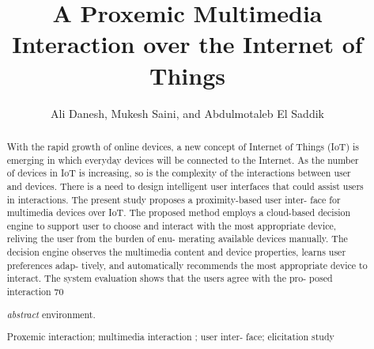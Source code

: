 \documentclass[runningheads,a4paper]{llncs}
\newcommand{\keywords}[1]{\par\addvspace\baselineskip
\noindent\keywordname\enspace\ignorespaces#1}
\begin{document}
\mainmatter  %

\title{A Proxemic Multimedia Interaction over the Internet of Things}


%
%
\author{Ali Danesh, Mukesh Saini, and Abdulmotaleb El Saddik }






%
%

\maketitle


\begin{abstract}
With the rapid growth of online devices, a new concept of Internet of Things (IoT) is emerging in which everyday devices will be connected to the Internet. As the number of devices in IoT is increasing, so is the complexity of the interactions between user and devices. There is a need to design intelligent user interfaces that could assist users in interactions. The present study proposes a proximity-based user inter- face for multimedia devices over IoT. The proposed method employs a cloud-based decision engine to support user to choose and interact with the most appropriate device, reliving the user from the burden of enu- merating available devices manually. The decision engine observes the multimedia content and device properties, learns user preferences adap- tively, and automatically recommends the most appropriate device to interact. The system evaluation shows that the users agree with the pro- posed interaction 70%

\emph{abstract} environment.
\keywords{Proxemic interaction; multimedia interaction ; user inter- face; elicitation study 
}
\end{abstract}
\end{document}
